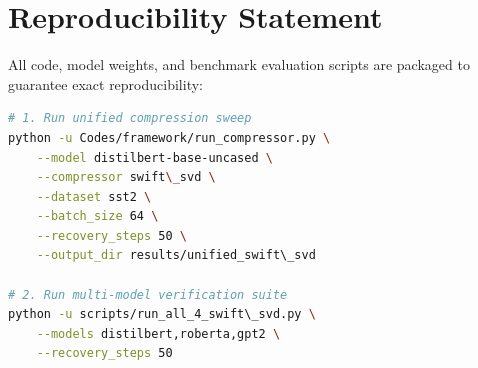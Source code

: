 \section{Reproducibility Statement}
All code, model weights, and benchmark evaluation scripts are packaged to guarantee exact reproducibility:
\begin{lstlisting}[language=bash]
# 1. Run unified compression sweep
python -u Codes/framework/run_compressor.py \
    --model distilbert-base-uncased \
    --compressor swift\_svd \
    --dataset sst2 \
    --batch_size 64 \
    --recovery_steps 50 \
    --output_dir results/unified_swift\_svd

# 2. Run multi-model verification suite
python -u scripts/run_all_4_swift\_svd.py \
    --models distilbert,roberta,gpt2 \
    --recovery_steps 50
\end{lstlisting}

